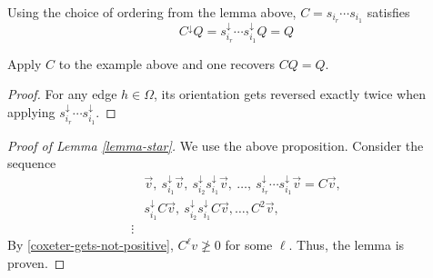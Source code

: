 \documentclass[11pt,leqno,oneside]{amsbook}
\numberwithin{thm}{section}
\renewcommand{\Q}{Q} %
\newcommand{\sinktosource}{s^\downarrow} %
\begin{document}
\begin{prop}
  Using the choice of ordering from the lemma above, \(C =
  s_{i_r} \cdots s_{i_1}\) satisfies \[
    C^{\downarrow} \Q = \sinktosource_{i_r} \cdots \sinktosource_{i_1}
    \Q = \Q
  \]
\end{prop}
\begin{example}
  Apply \(C\) to the example above and one recovers \(C \Q = \Q\).
\end{example}
\begin{proof}
  For any edge \(h \in \Omega\), its orientation gets reversed exactly
  twice when applying \(\sinktosource_{i_r} \cdots \sinktosource_{i_1}\).
\end{proof}
\begin{proof}[Proof of Lemma \ref{lemma-star}]
  We use the above proposition. Consider the sequence
  \begin{align*}
    &\vec{v},\ \sinktosource_{i_1} \vec{v},\ \sinktosource_{i_2}
    \sinktosource_{i_1} \vec{v},\ \ldots,\ \sinktosource_{i_r} \cdots
    \sinktosource_{i_1} \vec{v} = C \vec{v}, \\
    &\sinktosource_{i_1} C \vec{v}, \ \sinktosource_{i_2}
    \sinktosource_{i_1} C \vec{v}, \ldots, C^2 \vec{v}, \\
    \vdots
  \end{align*}
  By \ref{coxeter-gets-not-positive}, \(C^\ell v \not \geq 0\) for
  some \(\ell\). Thus, the lemma is proven. 
\end{proof}
\end{document}
